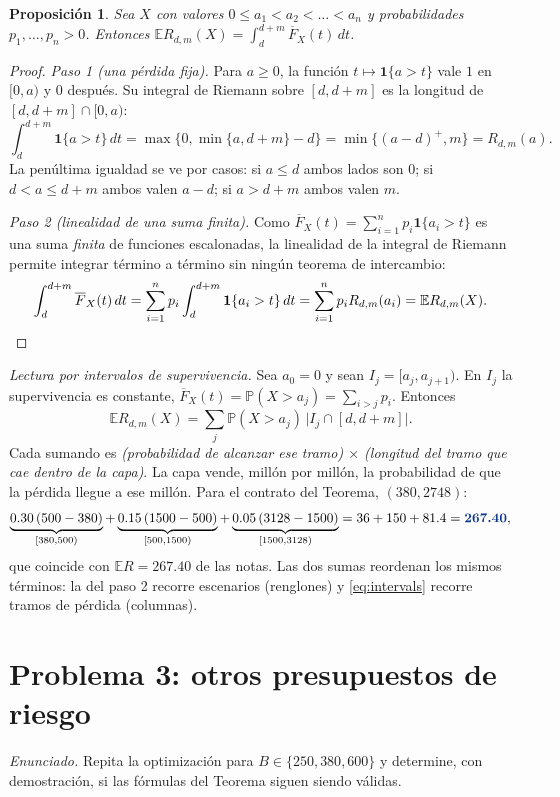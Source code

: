 \documentclass[11pt,reqno]{amsart}
\newtheorem{proposition}[theorem]{Proposición}
\theoremstyle{definition}\newtheorem{definition}[theorem]{Definición}
\theoremstyle{remark}\newtheorem{remark}[theorem]{Observación}
\newcommand{\E}{\mathbb E}
\newcommand{\Prob}{\mathbb P}
\newcommand{\pos}[1]{(#1)^+}
\newcommand{\resultado}[1]{\ensuremath{{\color{resultblue}\boldsymbol{#1}}}}
\begin{document}
\begin{proposition}
Sea $X$ con valores $0\le a_1<a_2<\dots<a_n$ y probabilidades $p_1,\dots,p_n>0$. Entonces $\E R_{d,m}(X)=\int_d^{d+m}\overline F_X(t)\,dt$.
\end{proposition}
\begin{proof}
\emph{Paso 1 (una pérdida fija).} Para $a\ge0$, la función $t\mapsto\mathbf 1\{a>t\}$ vale $1$ en $[0,a)$ y $0$ después. Su integral de Riemann sobre $[d,d+m]$ es la longitud de $[d,d+m]\cap[0,a)$:
\[
\int_d^{d+m}\mathbf 1\{a>t\}\,dt=\max\{0,\min\{a,d+m\}-d\}=\min\{\pos{a-d},m\}=R_{d,m}(a).
\]
La penúltima igualdad se ve por casos: si $a\le d$ ambos lados son $0$; si $d<a\le d+m$ ambos valen $a-d$; si $a>d+m$ ambos valen $m$.

\emph{Paso 2 (linealidad de una suma finita).} Como $\overline F_X(t)=\sum_{i=1}^n p_i\mathbf 1\{a_i>t\}$ es una suma \emph{finita} de funciones escalonadas, la linealidad de la integral de Riemann permite integrar término a término sin ningún teorema de intercambio:
\[
\int_d^{d+m}\overline F_X(t)\,dt=\sum_{i=1}^n p_i\int_d^{d+m}\mathbf 1\{a_i>t\}\,dt=\sum_{i=1}^n p_i R_{d,m}(a_i)=\E R_{d,m}(X).\qedhere
\]
\end{proof}

\emph{Lectura por intervalos de supervivencia.} Sea $a_0=0$ y sean $I_j=[a_j,a_{j+1})$. En $I_j$ la supervivencia es constante, $\overline F_X(t)=\Prob(X>a_j)=\sum_{i>j}p_i$. Entonces
\begin{equation}\label{eq:intervals}
\E R_{d,m}(X)=\sum_{j}\Prob(X>a_j)\,\bigl|I_j\cap[d,d+m]\bigr|.
\end{equation}
Cada sumando es \emph{(probabilidad de alcanzar ese tramo) $\times$ (longitud del tramo que cae dentro de la capa)}. La capa vende, millón por millón, la probabilidad de que la pérdida llegue a ese millón. Para el contrato del Teorema, $(380,2748)$:
\[
\underbrace{0.30\,(500-380)}_{[380,500)}+\underbrace{0.15\,(1500-500)}_{[500,1500)}+\underbrace{0.05\,(3128-1500)}_{[1500,3128)}=36+150+81.4=\resultado{267.40},
\]
que coincide con $\E R=267.40$ de las notas. Las dos sumas reordenan los mismos términos: la del paso 2 recorre escenarios (renglones) y \eqref{eq:intervals} recorre tramos de pérdida (columnas).

\section{Problema 3: otros presupuestos de riesgo}
\emph{Enunciado.} Repita la optimización para $B\in\{250,380,600\}$ y determine, con demostración, si las fórmulas del Teorema siguen siendo válidas.
\end{document}
